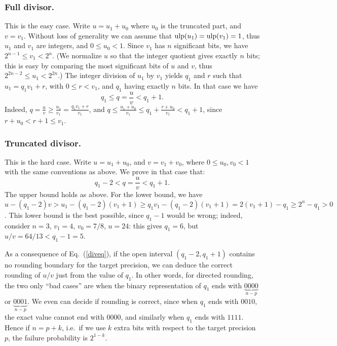 \documentclass[12pt]{amsart}
\def\ulp{{\rm ulp}}
\begin{document}
\subsubsection{Full divisor.}
This is the easy case. Write $u = u_1 + u_0$ where $u_0$ is the truncated
part, and $v = v_1$. Without loss of generality we can assume that
$\ulp(u_1)=\ulp(v_1)=1$, thus $u_1$ and $v_1$ are integers, and
$0 \leq u_0 < 1$.
Since $v_1$ has $n$ significant bits, we have $2^{n-1} \leq v_1 < 2^n$.
(We normalize $u$ so that the integer quotient gives exactly $n$ bits;
this is easy by comparing the most significant bits of $u$ and $v$,
thus $2^{2n-2} \leq u_1 < 2^{2n}$.)
The integer division of $u_1$ by $v_1$ yields $q_1$ and $r$
such that $u_1 = q_1 v_1 + r$, with $0 \leq r < v_1$, and
$q_1$ having exactly $n$ bits.
In that case we have
\[ q_1 \leq q=\frac{u}{v} < q_1 + 1. \]
Indeed, $q = \frac{u}{v} \geq \frac{u_1}{v_1} = \frac{q_1 v_1 + r}{v_1}$,
and $q \leq \frac{u_1+u_0}{v_1} \leq q_1 + \frac{r + u_0}{v_1} < q_1 + 1$,
since $r + u_0 < r+1 \leq v_1$.

\subsubsection{Truncated divisor.} This is the hard case.
Write $u = u_1 + u_0$, and $v = v_1 + v_0$, where $0 \leq u_0, v_0 < 1$
with the same conventions as above.
We prove in that case that:
\begin{equation} \label{diveq}
q_1-2 < q = \frac{u}{v} < q_1 + 1.
\end{equation}
The upper bound holds as above.
For the lower bound, we have $u - (q_1-2) v >
u_1 - (q_1-2) (v_1+1) \geq q_1 v_1 - (q_1-2) (v_1+1)
= 2 (v_1+1) - q_1 \geq 2^n - q_1 > 0$.
This lower bound is the best possible, since $q_1-1$ would be wrong;
indeed, consider $n=3$, $v_1=4$, $v_0 = 7/8$, $u=24$: this gives $q_1 = 6$,
but $u/v = 64/13 < q_1-1 = 5$.

As a consequence of Eq.~(\ref{diveq}), if the open interval $(q_1-2, q_1+1)$
contains no rounding boundary for the target precision, we can deduce the
correct rounding of $u/v$ just from the value of $q_1$.
In other words, for directed rounding, the two only ``bad cases'' are when
the binary representation of $q_1$ ends with $\underbrace{0000}_{n-p}$
or $\underbrace{0001}_{n-p}$.
We even can decide if rounding is correct, since when $q_1$ ends with $0010$,
the exact value cannot end with $0000$, and similarly
when $q_1$ ends with $1111$.
Hence if $n=p+k$, i.e.\ if we use $k$ extra bits with respect to the target
precision $p$, the failure probability is $2^{1-k}$.
\end{document}
